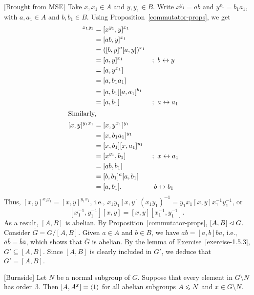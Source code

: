 \begin{solution} {[Brought from \href{https://math.stackexchange.com/q/3488256}{MSE}]} Take $x,x_1\in A$ and $y,y_1\in B$. Write $x^{y_1}=ab$ and $y^{x_1}=b_1a_1$, with $a,a_1\in A$ and $b,b_1\in B$. Using Proposition~\ref{commutator-props}, we get
\begin{align*}
    [x,y]^{x_1y_1} &= [x^{y_1},y]^{x_1}\\
        &= [ab,y]^{x_1}\\
        &= ([b,y]^a[a,y])^{x_1}\\
        &= [a,y]^{x_1}    &&;\ b\leftrightarrow y\\
        &= [a,y^{x_1}]\\
        &= [a,b_1a_1]\\
        &= [a,b_1][a,a_1]^{b_1}\\
        &= [a,b_1]  &&;\ a\leftrightarrow a_1\\
    \intertext{Similarly,}
    [x,y]^{y_1x_1} &= [x,y^{x_1}]^{y_1}\\
        &= [x,b_1a_1]^{y_1}\\
        &= [x,b_1][x,a_1]^{y_1}\\
        &= [x^{y_1},b_1]  &&;\ x\leftrightarrow a_1\\
        &= [ab,b_1]\\
        &= [b,b_1]^a[a,b_1]\\
        &= [a,b_1].  &&\; b\leftrightarrow b_1
\end{align*}
Thus, $[x,y]^{x_1y_1}=[x,y]^{y_1x_1}$, i.e., $x_1y_1[x,y](x_1y_1)^{-1}=y_1x_1[x,y]x_1^{-1}y_1^{-1}$, or
$$
    [x_1^{-1},y_1^{-1}][x,y]=[x,y][x_1^{-1},y_1^{-1}].
$$
As a result, $[A,B]$ is abelian. By Proposition~\ref{commutator-props}, $[A,B]\lhd G$. Consider $\bar G=G/[A,B]$. Given $a\in A$ and $b\in B$, we have $ab=[a,b]ba$, i.e., $\bar a\bar b=\bar b\bar a$, which shows that $\bar G$ is abelian. By the lemma of Exercise~\ref{exercise-1.5.3}, $G'\subseteq[A,B]$. Since $[A,B]$ is clearly included in $G'$, we deduce that $G'=[A,B]$.  \end{solution}

\begin{exr} \textrm{\rm[Burnside]}
    Let\/ $N$ be a normal subgroup of\/ $G$. Suppose that every element in\/ $G\setminus N$ has order\/~$3$. Then\/ $[A,A^x]=\langle1\rangle$ for all abelian subgroups\/ $A\leqslant N$ and\/ $x\in G\setminus N$.
\end{exr}


